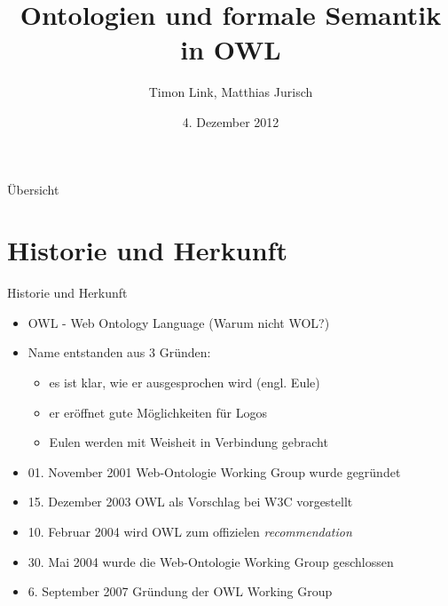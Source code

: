 \documentclass{beamer}
\title[OWL]{Ontologien und formale Semantik in OWL}
\author{Timon Link, Matthias Jurisch}
\date{4. Dezember 2012}
\begin{document}
\begin{frame}
\titlepage
\end{frame}

\begin{frame}{Übersicht}
\tableofcontents
\end{frame}

\section{Historie und Herkunft}
\begin{frame}{Historie und Herkunft}
	\begin{itemize}
	\item OWL - Web Ontology Language (Warum nicht WOL?)
	\item Name entstanden aus 3 Gründen:
		\begin{itemize}
			\item es ist klar, wie er ausgesprochen wird (engl. Eule) 
			\item er eröffnet gute Möglichkeiten für Logos
			\item Eulen werden mit Weisheit in Verbindung gebracht
		\end{itemize}
	\item 01. November 2001 Web-Ontologie Working Group wurde gegründet
	\item 15. Dezember 2003 OWL als Vorschlag bei W3C vorgestellt
	\item 10. Februar 2004 wird OWL zum offizielen \textit{recommendation}
	\item 30. Mai 2004 wurde die Web-Ontologie Working Group geschlossen
	\item 6. September 2007 Gründung der OWL Working Group 
	\end{itemize}
\end{frame}
\end{document}
